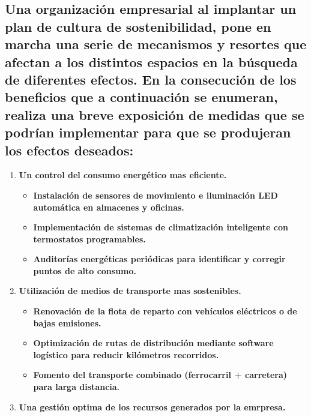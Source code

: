 
\fsection{\boldit{\textcolor{waveBlue2}{Actividades:}}} 
\subsection*{Una organización empresarial al implantar un plan de cultura de sostenibilidad, pone en marcha una serie de mecanismos y resortes que afectan a los distintos espacios en la búsqueda de diferentes efectos.
En la consecución de los beneficios que a continuación se enumeran, realiza una breve exposición de medidas que se podrían implementar para que se produjeran los efectos deseados:}

\begin{solution}
	\begin{enumerate}[label=\alph*)]
		\item \textbf{Un control del consumo energético mas eficiente.}

			\begin{itemize}

				\item \textbf{Instalación de sensores de movimiento e iluminación LED automática en almacenes y oficinas.}
				\item \textbf{Implementación de sistemas de climatización inteligente con termostatos programables.}
				\item \textbf{Auditorías energéticas periódicas para identificar y corregir puntos de alto consumo.}
				
			\end{itemize}


		\item \textbf{Utilización de medios de transporte mas sostenibles.}

			\begin{itemize}

				\item \textbf{Renovación de la flota de reparto con vehículos eléctricos o de bajas emisiones.}
				\item \textbf{Optimización de rutas de distribución mediante software logístico para reducir kilómetros recorridos.}
				\item \textbf{Fomento del transporte combinado (ferrocarril + carretera) para larga distancia.}
				
			\end{itemize}


		\item \textbf{Una gestión optima de los recursos generados por la emrpresa.}
			

\end{enumerate}
\end{solution}
